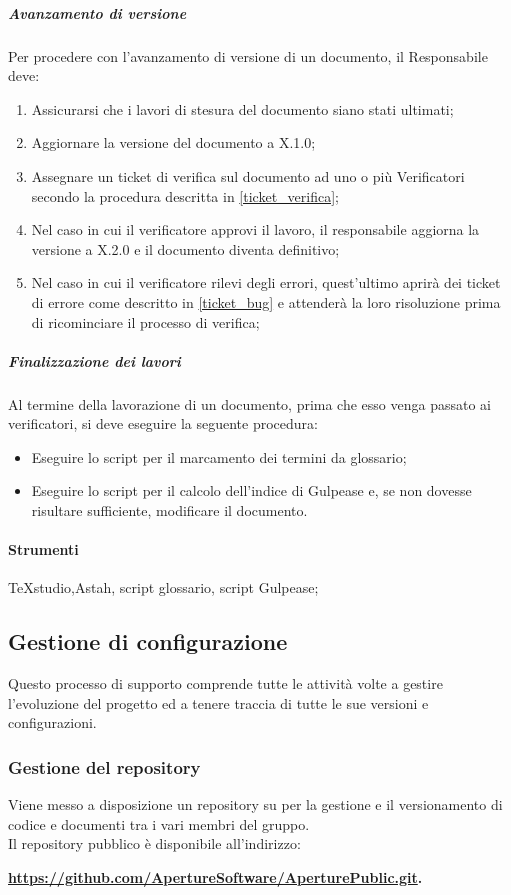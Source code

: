 \subparagraph{Avanzamento di versione}
Per procedere con l'avanzamento di versione di un documento, il Responsabile deve:
\begin{enumerate}
\item Assicurarsi che i lavori di stesura del documento siano stati ultimati;
\item Aggiornare la versione del documento a X.1.0;
\item Assegnare un ticket di verifica sul documento ad uno o più Verificatori secondo la procedura descritta in \ref{ticket_verifica};
\item Nel caso in cui il verificatore approvi il lavoro, il responsabile aggiorna la versione a X.2.0 e il documento diventa definitivo;
\item Nel caso in cui il verificatore rilevi degli errori, quest'ultimo aprirà dei ticket di errore come descritto in \ref{ticket_bug} e attenderà la loro risoluzione prima di ricominciare il processo di verifica;
\end{enumerate}

\subparagraph{Finalizzazione dei lavori}
Al termine della lavorazione di un documento, prima che esso venga passato ai verificatori, si deve eseguire la seguente procedura:
\begin{itemize}
\item Eseguire lo script per il marcamento dei termini da glossario;
\item Eseguire lo script per il calcolo dell'indice di Gulpease e, se non dovesse risultare sufficiente, modificare il documento.
\end{itemize}

\paragraph{Strumenti}
TeXstudio,Astah, script glossario, script Gulpease;



\subsection{Gestione di configurazione}
Questo processo di supporto comprende tutte le attività volte a gestire l'evoluzione del progetto ed a tenere traccia di tutte le sue versioni e configurazioni.

\subsubsection{Gestione del repository}
Viene messo a disposizione un repository  su  per la gestione e il versionamento di codice e documenti tra i vari membri del gruppo.\\
Il repository pubblico è disponibile all'indirizzo: \\
\begin{center}
\textbf{\url{https://github.com/ApertureSoftware/AperturePublic.git}.}
\end{center}


